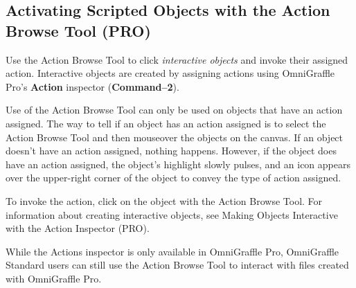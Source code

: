 \documentclass[../main.tex]{subfiles}
\begin{document}
\subsection{ Activating Scripted Objects with the
Action Browse Tool (\texorpdfstring{\textbf{PRO}}{PRO})}

\begin{ogpro}
  Use the Action Browse Tool to click \textit{interactive objects} and invoke their assigned
  action. Interactive objects are created by assigning actions using OmniGraffle Pro's
  \textbf{Action} inspector (\textbf{Command--2}).

  Use of the Action Browse Tool can only be used on objects that have an action assigned. The
  way to tell if an object has an action assigned is to select the Action Browse Tool and then
  mouseover the objects on the canvas. If an object doesn't have an action assigned, nothing
  happens. However, if the object does have an action assigned, the object's highlight slowly
  pulses, and an icon appears over the upper-right corner of the object to convey the type of
  action assigned.


  To invoke the action, click on the object with the Action Browse Tool. For information about
  creating interactive objects, see Making Objects Interactive with the Action Inspector
  (PRO).

  While the Actions inspector is only available in OmniGraffle Pro, OmniGraffle Standard users
  can still use the Action Browse Tool to interact with files created with OmniGraffle Pro.
\end{ogpro}
\end{document}

